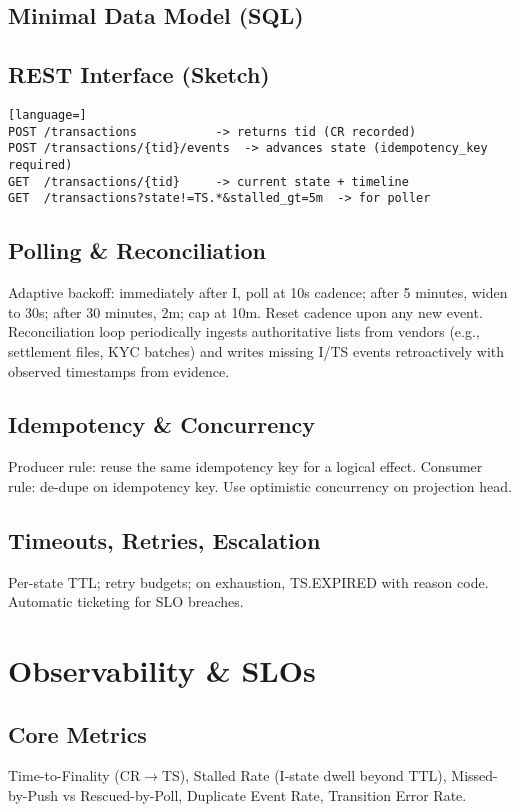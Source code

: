 \documentclass[11pt]{article}
\begin{document}
\subsection{Minimal Data Model (SQL)}


\subsection{REST Interface (Sketch)}
\begin{lstlisting}[language=]
POST /transactions           -> returns tid (CR recorded)
POST /transactions/{tid}/events  -> advances state (idempotency_key required)
GET  /transactions/{tid}     -> current state + timeline
GET  /transactions?state!=TS.*&stalled_gt=5m  -> for poller
\end{lstlisting}

\subsection{Polling \& Reconciliation}
Adaptive backoff: immediately after I, poll at 10s cadence; after 5 minutes, widen to 30s; after 30 minutes, 2m; cap at 10m. Reset cadence upon any new event.
Reconciliation loop periodically ingests authoritative lists from vendors (e.g., settlement files, KYC batches) and writes missing I/TS events retroactively with observed timestamps from evidence.

\subsection{Idempotency \& Concurrency}
Producer rule: reuse the same idempotency key for a logical effect. Consumer rule: de-dupe on idempotency key. Use optimistic concurrency on projection head.

\subsection{Timeouts, Retries, Escalation}
Per-state TTL; retry budgets; on exhaustion, TS.EXPIRED with reason code. Automatic ticketing for SLO breaches.

\section{Observability \& SLOs}
\subsection{Core Metrics}
Time-to-Finality (CR$\to$TS), Stalled Rate (I-state dwell beyond TTL), Missed-by-Push vs Rescued-by-Poll, Duplicate Event Rate, Transition Error Rate.
\end{document}
